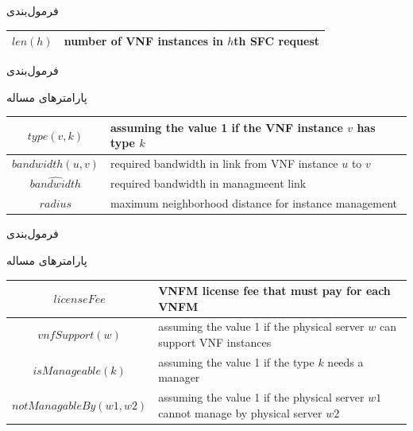 \documentclass{beamer}
\begin{document}
\begin{persian}
\begin{frame}{فرمول‌بندی}
\begin{center}
\begin{latin}
\begin{tabular}{|c|p{5cm}|}
        \hline
        \(len(h)\) & number of VNF instances in \(h\)th SFC request \\
        \hline
    \end{tabular}\end{latin}\end{center}
\end{frame}
\begin{frame}{فرمول‌بندی}
    \par پارامترهای مساله
    \begin{center}\begin{latin}\begin{tabular}{|c|p{5cm}|}
        \hline
        \(type(v, k)\) & assuming the value 1 if the VNF instance \(v\) has type \(k\)  \\
        \hline
        \(bandwidth(u, v)\) & required bandwidth in link from VNF instance \(u\) to \(v\) \\
        \hline
        \(\hat{bandwidth}\) & required bandwidth in managmeent link \\
        \hline
        \(radius\) & maximum neighborhood distance for instance management \\
        \hline
    \end{tabular}\end{latin}\end{center}
\end{frame}
\begin{frame}{فرمول‌بندی}
    \par پارامترهای مساله
    \begin{center}\begin{latin}\begin{tabular}{|c|p{5cm}|}
        \hline
        \(licenseFee\) & VNFM license fee that must pay for each VNFM \\
        \hline
        \(vnfSupport(w)\) & assuming the value 1 if the physical server \(w\) can support VNF instances \\
        \hline
        \(isManageable(k)\) & assuming the value 1 if the type \(k\) needs a manager \\
        \hline
        \(notManagableBy(w1, w2)\) & assuming the value 1 if the physical server \(w1\) cannot manage by physical server \(w2\) \\
        \hline
    \end{tabular}\end{latin}\end{center}

\end{frame}
\end{persian}
\end{document}

